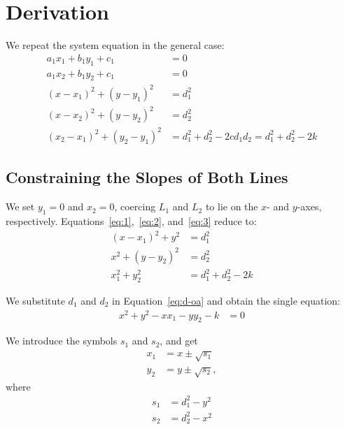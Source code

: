 \section{Derivation}
\label{sec:derivation}
We repeat the system equation in the general case:
\begin{align}
  a_1 x_1 + b_1 y_1 + c_1 &= 0\\
  a_1 x_2 + b_1 y_2 + c_1 &= 0\\
  (x - x_1)^2 + (y - y_1)^2 &= d_1^2\label{eq:1}\\
  (x - x_2)^2 + (y - y_2)^2 &= d_2^2\label{eq:2}\\
  (x_2 - x_1)^2 + (y_2 - y_1)^2 &= d_1^2 + d_2^2 - 2 c d_1 d_2 = d_1^2 + d_2^2 - 2 k\label{eq:3}
\end{align}

\subsection{Constraining the Slopes of Both Lines}
\label{ssec:derivation-constraining-slopes}
We set $y_1 = 0$ and $x_2 = 0$, coercing $L_1$ and $L_2$ to lie on the
$x$- and $y$-axes, respectively.
Equations~\ref{eq:1},~\ref{eq:2}, and~\ref{eq:3} reduce to:
\begin{align}
  (x - x_1)^2 + y^2 &= d_1^2\label{eq:d1-oa}\\
  x^2 + (y - y_2)^2 &= d_2^2\label{eq:d2-oa}\\
  x_1^2 + y_2^2 &= d_1^2 + d_2^2 - 2 k\label{eq:d-oa}
\end{align}

\noindent
We substitute $d_1$ and $d_2$ in Equation~\ref{eq:d-oa} and obtain the single equation:
\begin{align}
  x^2 + y^2 - x x_1 - y y_2 - k &= 0\label{eq:s-oa}
\end{align}

\noindent
We introduce the symbols $s_1$ and $s_2$, and get
\begin{align*}
  x_1 &= x \pm \sqrt{s_1}\\
  y_2 &= y \pm \sqrt{s_2},
\end{align*}
where
\begin{align*}
  s_1 &= d_1^2 - y^2\\
  s_2 &= d_2^2 - x^2
\end{align*}

